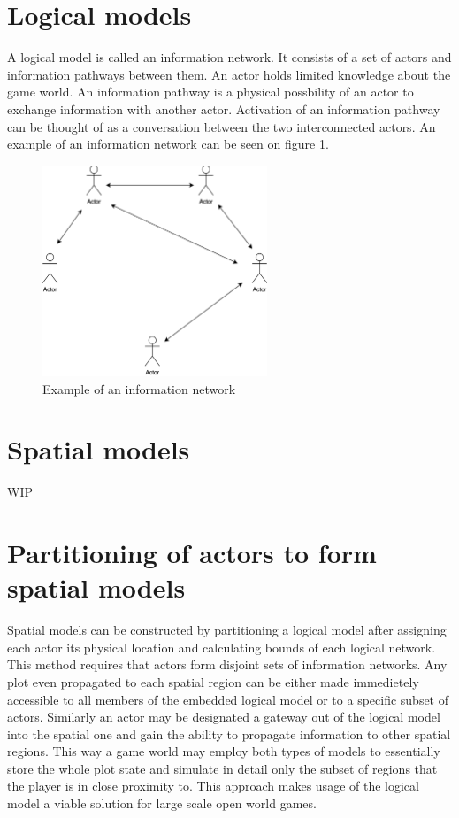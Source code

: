 \section{Logical models}

A logical model is called an information network.
It consists of a set of actors and information pathways between them.
An actor holds limited knowledge about the game world.
An information pathway is a physical possbility of an actor to exchange information with another actor.
Activation of an information pathway can be thought of as a conversation between the two interconnected actors.
An example of an information network can be seen on figure \ref{fig:logical_model_example}.

\begin{figure}
    \centering
    \includegraphics[width=0.6\textwidth]{images/logical_model_example.png}
    \caption{Example of an information network}\label{fig:logical_model_example}
\end{figure}

\section{Spatial models}

WIP

\section{Partitioning of actors to form spatial models}

Spatial models can be constructed by partitioning a logical model after assigning each actor its physical location and calculating bounds of each logical network.
This method requires that actors form disjoint sets of information networks.
Any plot even propagated to each spatial region can be either made immedietely accessible to all members of the embedded logical model or to a specific subset of actors.
Similarly an actor may be designated a gateway out of the logical model into the spatial one and gain the ability to propagate information to other spatial regions.
This way a game world may employ both types of models to essentially store the whole plot state and simulate in detail only the subset of regions that the player is in close proximity to.
This approach makes usage of the logical model a viable solution for large scale open world games.

